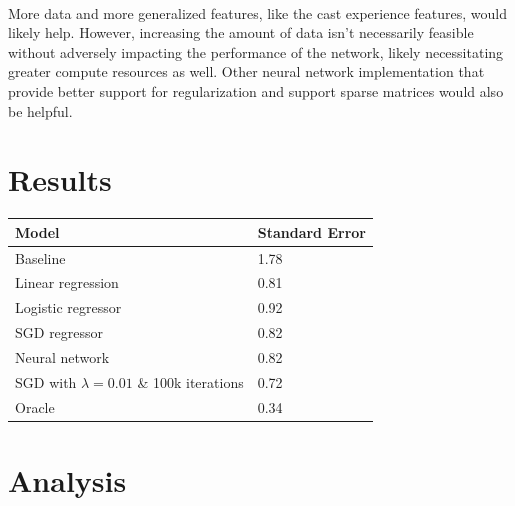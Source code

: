 \documentclass[journal]{IEEEtran}
\begin{document}
\\
\par More data and more generalized features, like the cast experience features, would likely help.  However, increasing the amount of data isn't necessarily feasible without adversely impacting the performance of the network, likely necessitating greater compute resources as well.  Other neural network implementation that provide better support for regularization and support sparse matrices would also be helpful.

\section{Results}
\smallskip
\begin{center}
\begin{tabular}{|l | l|} %
\hline
Model               & Standard Error  \\ [0.5ex] %
\hline
Baseline            & 1.78 \\
\hline
Linear regression  & 0.81 \\
Logistic regressor  & 0.92 \\
SGD regressor       & 0.82 \\
Neural network      & 0.82 \\
SGD with $ \lambda = 0.01 $ \& 100k iterations & 0.72 \\
\hline
Oracle              & 0.34 \\
\hline %
\end{tabular}
\end{center}
\smallskip


\section{Analysis}
\end{document}
